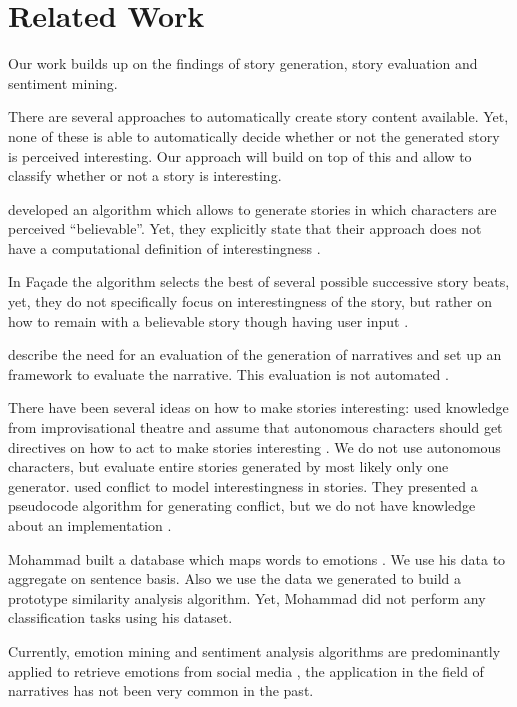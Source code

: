 \documentclass[letterpaper]{article}
\begin{document}
\section{Related Work}
Our work builds up on the findings of story generation, story evaluation and sentiment mining. 

There are several approaches to automatically create story content available. Yet, none of these is able to automatically decide whether or not the generated story is perceived interesting. Our approach will build on top of this and allow to classify whether or not a story is interesting.

\citeauthor{Riedl} developed an algorithm which allows to generate stories in which characters are perceived ``believable''. Yet, they explicitly state that their approach does not have a computational definition of interestingness \cite{Riedl}. 

In Fa\c{c}ade the algorithm selects the best of several possible successive story beats, yet, they do not specifically focus on interestingness of the story, but rather on how to remain with a believable story though having user input \cite{Mateas}. 

\citeauthor{rowe2009storyeval} describe the need for an evaluation of the generation of narratives and set up an framework to evaluate the narrative. This evaluation is not automated \cite{rowe2009storyeval}.

There have been several ideas on how to make stories interesting: \citeauthor{swartjes} used knowledge from improvisational theatre and assume that autonomous characters should get directives on how to act to make stories interesting \cite{swartjes}. We do not use autonomous characters, but evaluate entire stories generated by most likely only one generator. \citeauthor{ware} used conflict to model interestingness in stories. They presented a pseudocode algorithm for generating conflict, but we do not have knowledge about an implementation \cite{ware}. 

Mohammad built a database which maps words to emotions \cite{Mohammad}. We use his data to aggregate on sentence basis. Also we use the data we generated to build a prototype similarity analysis algorithm. Yet, Mohammad did not perform any classification tasks using his dataset. 

Currently, emotion mining and sentiment analysis algorithms are predominantly applied to retrieve emotions from social media \cite{pak}, the application in the field of narratives has not been very common in the past. 
\end{document}
